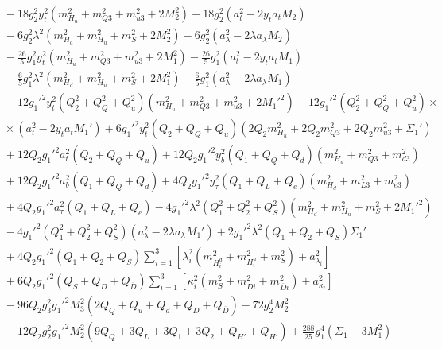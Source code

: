 \documentclass[preprint,amsmath,amssymb,aps,superscriptaddress,prd,showpacs,floatfix,nofootinbib]{revtex4-1}
\begin{document}
\begin{subequations}
\begin{align}
&{}-18g_2^2y_t^2\left ( m_{H_u}^2+m_{Q3}^2+m_{u3}^2+2M_2^2\right )-18g_2^2\left ( a_t^2-2y_ta_tM_2\right )\\
&{}-6g_2^2\lambda^2\left ( m_{H_d}^2+m_{H_u}^2+m_S^2+2M_2^2\right )-6g_2^2\left ( a_\lambda^2-2\lambda a_\lambda M_2\right )\nonumber\\
&{}-\frac{26}{5}g_1^2y_t^2\left ( m_{H_u}^2+m_{Q3}^2+m_{u3}^2+2M_1^2\right )-\frac{26}{5}g_1^2\left ( a_t^2-2y_ta_tM_1\right )\nonumber\\
&{}-\frac{6}{5}g_1^2\lambda^2\left ( m_{H_d}^2+m_{H_u}^2+m_S^2+2M_1^2\right )-\frac{6}{5}g_1^2\left ( a_\lambda^2-2\lambda a_\lambda M_1\right )\nonumber\\
&{}-12g_1'^2y_t^2\left ( Q_2^2+Q_Q^2+Q_u^2\right )\left ( m_{H_u}^2+m_{Q3}^2+m_{u3}^2+2M_1'^2\right )-12g_1'^2\left ( Q_2^2+Q_Q^2+Q_u^2\right )\times\nonumber\\
&{}\times\left ( a_t^2-2y_ta_tM_1'\right )+6g_1'^2y_t^2\left ( Q_2+Q_Q+Q_u\right )\left ( 2Q_2m_{H_u}^2+2Q_2m_{Q3}^2+2Q_2m_{u3}^2+\Sigma_1'\right )\nonumber\\
&{}+12Q_2g_1'^2a_t^2\left ( Q_2+Q_Q+Q_u\right )+12Q_2g_1'^2y_b^2\left ( Q_1+Q_Q+Q_d\right )\left ( m_{H_d}^2+m_{Q3}^2+m_{d3}^2\right )\nonumber\\
&{}+12Q_2g_1'^2a_b^2\left ( Q_1+Q_Q+Q_d\right )+4Q_2g_1'^2y_\tau^2\left ( Q_1+Q_L+Q_e\right )\left ( m_{H_d}^2+m_{L3}^2+m_{e3}^2\right )\nonumber\\
&{}+4Q_2g_1'^2a_\tau^2\left ( Q_1+Q_L+Q_e\right )-4g_1'^2\lambda^2\left ( Q_1^2+Q_2^2+Q_S^2\right )\left ( m_{H_d}^2+m_{H_u}^2+m_S^2+2M_1'^2\right )\nonumber\\
&{}-4g_1'^2\left ( Q_1^2+Q_2^2+Q_S^2\right )\left ( a_\lambda^2-2\lambda a_\lambda M_1'\right )+2g_1'^2\lambda^2\left ( Q_1+Q_2+Q_S\right )\Sigma_1'\nonumber\\
&{}+4Q_2g_1'^2\left ( Q_1+Q_2+Q_S\right )\sum_{i=1}^3\left [ \lambda_i^2\left ( m_{H_i^d}^2+m_{H_i^u}^2+m_S^2\right )+a_{\lambda_i}^2\right ]\nonumber\\
&{}+6Q_2g_1'^2\left ( Q_S+Q_D+Q_{\overline{D}}\right )\sum_{i=1}^3\left [ \kappa_i^2\left ( m_S^2+m_{Di}^2+m_{\overline{D}i}^2\right )+a_{\kappa_i}^2\right ]\nonumber\\
&{}-96Q_2g_3^2g_1'^2M_3^2\left ( 2Q_Q+Q_u+Q_d+Q_D+Q_{\overline{D}}\right )-72g_2^4M_2^2\nonumber\\
&{}-12Q_2g_2^2g_1'^2M_2^2\left ( 9Q_Q+3Q_L+3Q_1+3Q_2+Q_{\overline{H'}}+Q_{H'}\right )+\frac{288}{25}g_1^4\left ( \Sigma_1-3M_1^2\right )\nonumber\\

\end{align}
\end{subequations}
\end{document}
